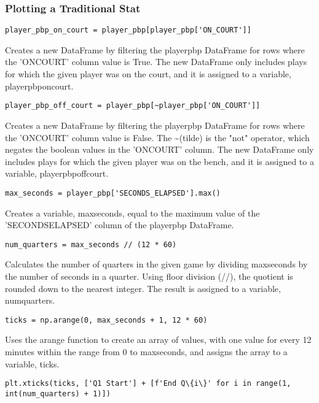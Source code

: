 \documentclass{article}
\begin{document}
\subsubsection{Plotting a Traditional Stat}
\begin{lstlisting}
player_pbp_on_court = player_pbp[player_pbp['ON_COURT']]
\end{lstlisting}
Creates a new DataFrame by filtering the player\textunderscore pbp DataFrame for rows where the 'ON\textunderscore COURT' column value is True. The new DataFrame only includes plays for which the given player was on the court, and it is assigned to a variable, player\textunderscore pbp\textunderscore on\textunderscore court.
\begin{lstlisting}
player_pbp_off_court = player_pbp[~player_pbp['ON_COURT']]
\end{lstlisting}
Creates a new DataFrame by filtering the player\textunderscore pbp DataFrame for rows where the 'ON\textunderscore COURT' column value is False. The \textasciitilde (tilde) is the "not" operator, which negates the boolean values in the 'ON\textunderscore COURT' column. The new DataFrame only includes plays for which the given player was on the bench, and it is assigned to a variable, player\textunderscore pbp\textunderscore off\textunderscore court.
\begin{lstlisting}
max_seconds = player_pbp['SECONDS_ELAPSED'].max()
\end{lstlisting}
Creates a variable, max\textunderscore seconds, equal to the maximum value of the 'SECONDS\textunderscore ELAPSED' column of the player\textunderscore pbp DataFrame.
\begin{lstlisting}
num_quarters = max_seconds // (12 * 60)
\end{lstlisting}
Calculates the number of quarters in the given game by dividing max\textunderscore seconds by the number of seconds in a quarter. Using floor division (//), the quotient is rounded down to the nearest integer. The result is assigned to a variable, num\textunderscore quarters.
\begin{lstlisting}
ticks = np.arange(0, max_seconds + 1, 12 * 60)
\end{lstlisting}
Uses the arange function to create an array of values, with one value for every 12 minutes within the range from 0 to max\textunderscore seconds, and assigns the array to a variable, ticks. 
\begin{lstlisting}
plt.xticks(ticks, ['Q1 Start'] + [f'End Q\{i\}' for i in range(1, int(num_quarters) + 1)])
\end{lstlisting}
\end{document}
